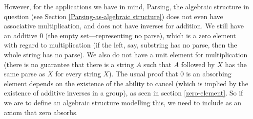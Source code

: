 However, for the applications we have in mind, Parsing, the algebraic structure in question (see Section \ref{Parsing-as-algebraic structure}) does not even have associative multiplication, and does not have inverses for addition. We still have an additive $0$ (the empty set---representing no parse), which is a zero element with regard to multiplication (if the left, say, substring has no parse, then the whole string has no parse). We also do not have a unit element for multiplication (there is no guarantee that there is a string $A$ such that $A$ followed by $X$ has the same parse as $X$ for every string $X$). The usual proof that $0$ is an absorbing element depends on the existence of the ability to cancel (which is implied by the existence of additive inverses in a group), as seen in section \ref{zero-element}. So if we are to define an algebraic structure modelling this, we need to include as an axiom that zero absorbs.

